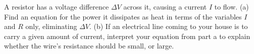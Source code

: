 A resistor has a voltage difference $\Delta V$ across it,
        causing a current $I$ to flow. \hwendpart
        (a) Find an equation for the
        power it dissipates as heat in terms of the variables $I$
        and $R$ only, eliminating $\Delta V$. 
        \answercheck\hwendpart
        (b) If an electrical
        line coming to your house is to carry a given amount of
        current, interpret your equation from part a to explain
        whether the wire's resistance should be small, or large.

